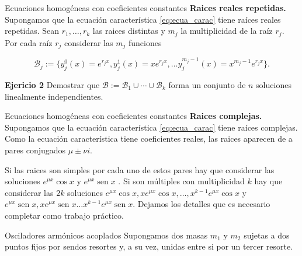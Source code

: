 \documentclass[handout,hyperref={colorlinks=true}]{beamer}
\DeclareMathOperator{\sen}{sen}
\begin{document}
\begin{frame}{Ecuaciones homogéneas con coeficientes constantes}
\textbf{Raices reales repetidas.}
Supongamos que la ecuación característica \eqref{eq:ecua_carac} tiene  raíces reales repetidas. Sean $r_1,\ldots,r_k$ las raices distintas y $m_j$ la multiplicidad de la raíz $r_j$. Por cada raíz $r_j$ considerar las $m_j$  funciones

\[\mathcal{B}_j:=\{y_j^0(x)=e^{r_jx}, y_j^1(x)=xe^{r_jx},\ldots y_j^{m_j-1}(x)=x^{m_j-1}e^{r_jx}\}.\]

 \textbf{Ejericio 2} Demostrar que $\mathcal{B}:=\mathcal{B}_1\cup\cdots\cup \mathcal{B}_k$ forma
 un conjunto de  $n$  soluciones linealmente independientes. 

\end{frame}

\begin{frame}{Ecuaciones homogéneas con coeficientes constantes}
\textbf{Raices complejas.}
Supongamos que la ecuación característica \eqref{eq:ecua_carac} tiene  raíces complejas. Como la ecuación característica tiene coeficientes reales, las raices aparecen de a pares conjugados $\mu\pm\nu i$. 

Si las raices son simples por cada uno de estos pares hay que considerar las soluciones $ e^{\mu x}\cos x$ y $e^{\mu x}\sen x$ . Si son múltiples con multiplicidad $k$ hay que considerar las $2k$ soluciones   $ e^{\mu x}\cos x, xe^{\mu x}\cos x,\ldots, x^{k-1}e^{\mu x}\cos x$ y $e^{\mu x}\sen x,xe^{\mu x}\sen x\ldots x^{k-1}e^{\mu x}\sen x $. Dejamos los detalles que es necesario completar como trabajo práctico.
 
\end{frame}


\begin{frame}{Osciladores armónicos acoplados}
Supongamos dos masas $m_1$ y $m_2$ sujetas a dos puntos fijos por sendos resortes y, a su vez, unidas entre si por un tercer resorte.  
\begin{center}
 \end{center}
\end{frame}
\end{document}
